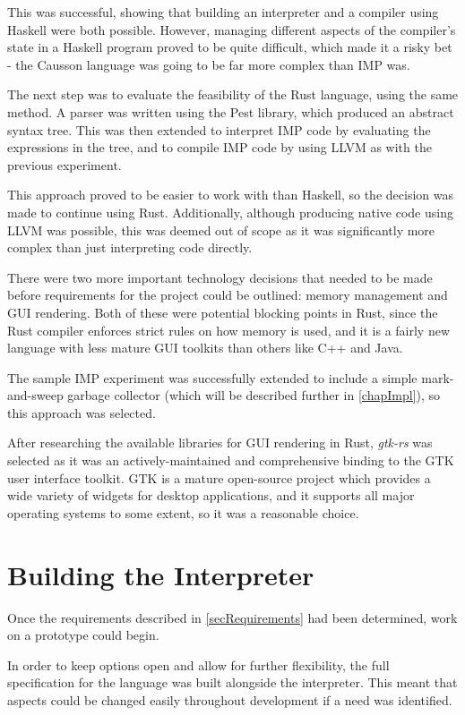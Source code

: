 \documentclass[11pt]{report}
\begin{document}
This was successful, showing that building an interpreter and a compiler using Haskell were both possible. However, managing different aspects of the compiler's state in a Haskell program proved to be quite difficult, which made it a risky bet - the Causson language was going to be far more complex than IMP was.

The next step was to evaluate the feasibility of the Rust language, using the same method. A parser was written using the Pest library\cite{pest}, which produced an abstract syntax tree. This was then extended to interpret IMP code by evaluating the expressions in the tree, and to compile IMP code by using LLVM as with the previous experiment.

This approach proved to be easier to work with than Haskell, so the decision was made to continue using Rust. Additionally, although producing native code using LLVM was possible, this was deemed out of scope as it was significantly more complex than just interpreting code directly.

There were two more important technology decisions that needed to be made before requirements for the project could be outlined: memory management and GUI rendering. Both of these were potential blocking points in Rust, since the Rust compiler enforces strict rules on how memory is used, and it is a fairly new language with less mature GUI toolkits than others like C++ and Java.

The sample IMP experiment was successfully extended to include a simple mark-and-sweep garbage collector (which will be described further in \cref{chapImpl}), so this approach was selected.

After researching the available libraries for GUI rendering in Rust, \emph{gtk-rs} was selected as it was an actively-maintained and comprehensive binding to the GTK user interface toolkit\cite{gtkrs}. GTK is a mature open-source project which provides a wide variety of widgets for desktop applications, and it supports all major operating systems to some extent, so it was a reasonable choice.

\section{Building the Interpreter}

Once the requirements described in \cref{secRequirements} had been determined, work on a prototype could begin.

In order to keep options open and allow for further flexibility, the full specification for the language was built alongside the interpreter. This meant that aspects could be changed easily throughout development if a need was identified.
\end{document}
